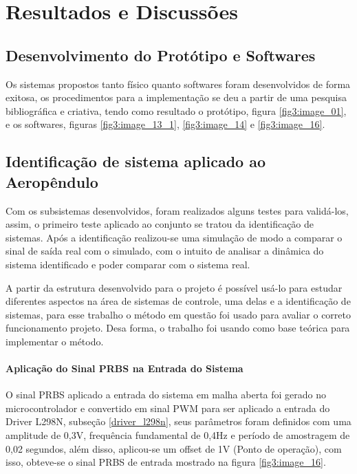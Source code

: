 \chapter{Resultados e Discussões}
\label{cap_3}

\section{Desenvolvimento do Protótipo e Softwares}

Os sistemas propostos tanto físico quanto softwares foram desenvolvidos de forma exitosa, os procedimentos para a implementação se deu a partir de uma pesquisa bibliográfica e criativa, tendo como resultado o protótipo, figura \ref{fig3:image_01}, e os softwares, figuras \ref{fig3:image_13_1}, \ref{fig3:image_14} e \ref{fig3:image_16}.


\section{Identificação de sistema aplicado ao Aeropêndulo}
\label{indentificacao}

Com os subsistemas desenvolvidos, foram realizados alguns testes para validá-los, assim, o primeiro teste aplicado ao conjunto se tratou da identificação de sistemas. Após a identificação realizou-se uma simulação de modo a comparar o sinal de saída real com o simulado, com o intuito de analisar a dinâmica do sistema identificado e poder comparar com o sistema real.

A partir da estrutura desenvolvido para o projeto é possível usá-lo para estudar diferentes aspectos na área de sistemas de controle, uma delas e a identificação de sistemas, para esse trabalho o método em questão foi usado para avaliar o correto funcionamento projeto. Desa forma, o trabalho \cite{tcc_klarissa_ufpa} foi usando como base teórica para implementar o método.


\subsubsection{Aplicação do Sinal PRBS na Entrada do Sistema}

O sinal PRBS aplicado a entrada do sistema em malha aberta foi gerado no microcontrolador e convertido em sinal PWM para ser aplicado a entrada do Driver L298N, subseção \ref{driver_l298n}, seus parâmetros foram definidos com uma amplitude de 0,3V, frequência fundamental de 0,4Hz e período de amostragem de 0,02 segundos, além disso, aplicou-se um offset de 1V (Ponto de operação), com isso, obteve-se o sinal PRBS de entrada mostrado na figura \ref{fig3:image_16}.



